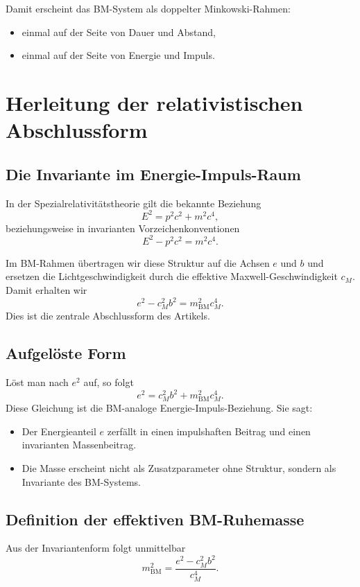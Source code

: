 \documentclass[11pt,a4paper]{article}
\theoremstyle{definition}
\theoremstyle{plain}
\begin{document}
	Damit erscheint das BM-System als doppelter Minkowski-Rahmen:
	\begin{itemize}[leftmargin=2em]
		\item einmal auf der Seite von Dauer und Abstand,
		\item einmal auf der Seite von Energie und Impuls.
	\end{itemize}
	
	\section{Herleitung der relativistischen Abschlussform}
	
	\subsection{Die Invariante im Energie-Impuls-Raum}
	
	In der Spezialrelativitätstheorie gilt die bekannte Beziehung
	\[
	E^2 = p^2 c^2 + m^2 c^4,
	\]
	beziehungsweise in invarianten Vorzeichenkonventionen
	\[
	E^2 - p^2 c^2 = m^2 c^4.
	\]
	
	Im BM-Rahmen übertragen wir diese Struktur auf die Achsen $e$ und $b$ und ersetzen die Lichtgeschwindigkeit durch die effektive Maxwell-Geschwindigkeit $c_M$. Damit erhalten wir
	\[
	e^2 - c_M^2 b^2 = m_{\mathrm{BM}}^2 c_M^4.
	\]
	Dies ist die zentrale Abschlussform des Artikels.
	
	\subsection{Aufgelöste Form}
	
	Löst man nach $e^2$ auf, so folgt
	\[
	e^2 = c_M^2 b^2 + m_{\mathrm{BM}}^2 c_M^4.
	\]
	Diese Gleichung ist die BM-analoge Energie-Impuls-Beziehung. Sie sagt:
	\begin{itemize}[leftmargin=2em]
		\item Der Energieanteil $e$ zerfällt in einen impulshaften Beitrag und einen invarianten Massenbeitrag.
		\item Die Masse erscheint nicht als Zusatzparameter ohne Struktur, sondern als Invariante des BM-Systems.
	\end{itemize}
	
	\subsection{Definition der effektiven BM-Ruhemasse}
	
	Aus der Invariantenform folgt unmittelbar
	\[
	m_{\mathrm{BM}}^2 = \frac{e^2 - c_M^2 b^2}{c_M^4}.
	\]
	
\end{document}
